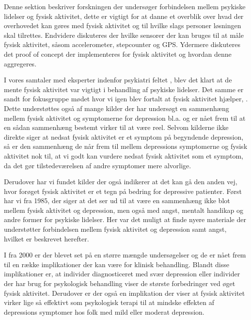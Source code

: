 Denne sektion beskriver forskningen der undersøger forbindelsen mellem psykiske lidelser og fysisk aktivitet, dette er vigtigt for at danne et overblik over hvad der overhovedet kan gøres med fysisk aktivitet og til hvilke slags personer løsningen skal tilrettes.
Endvidere diskuteres der hvilke sensorer der kan bruges til at måle fysisk aktivitet, såsom accelerometer, stepcounter og GPS.
Ydermere diskuteres det proof of concept der implementeres for fysisk aktivitet og hvordan denne aggregeres. 

I vores samtaler med eksperter indenfor psykiatri feltet \citep[Kapitel 1, Sektion 3 og 4]{misc:faellesrapp}, blev det klart at de mente fysisk aktivitet var vigtigt i behandling af psykiske lidelser.
Det samme er sandt for fokusgruppe mødet hvor vi igen blev fortalt at fysisk aktivitet hjælper, \citep[Kapitel 1, Sektion 5]{misc:faellesrapp}.
Dette understøttes også af mange kilder der har undersøgt en sammenhæng mellem fysisk aktivitet og symptomerne for depression bl.a. \citet{art:physDepSymptoms, Strawbridge15082002, Arredondo01072012} og er nået frem til at en sådan sammenhæng bestemt virker til at være reel.
Selvom kilderne ikke direkte siger at nedsat fysisk aktivitet er et symptom på begyndende depression, så er den sammenhæng de når frem til mellem depressions symptomerne og fysisk aktivitet nok til, at vi godt kan vurdere nedsat fysisk aktivitet som et symptom, da det gør tilstedeværelsen af andre symptomer mere alvorlige.

Derudover har vi fundet kilder der også indikerer at det kan gå den anden vej, hvor forøget fysisk aktivitet er et tegn på bedring for depressive patienter.
Først har vi \citet{misc:healthReports} fra 1985, der siger at det ser ud til at være en sammenhæng ikke blot mellem fysisk aktivitet og depression, men også med angst, mentalt handikap og andre former for psykiske lidelser.
Her var det muligt at finde nyere materiale der understøtter forbindelsen mellem fysisk aktivitet og depression samt angst, hvilket er beskrevet herefter.

I \citet{art:physMental} fra 2000 er der blevet set på en større mængde undersøgelser og de er nået frem til en række implikationer der kan være for klinisk behandling.
Blandt disse implikationer er, at individer diagnosticeret med svær depression eller individer der har brug for psykologisk behandling viser de største forbedringer ved øget fysisk aktivitet.
Derudover er der også en implikation der viser at fysisk aktivitet virker lige så effektivt som psykologisk terapi til at mindske effekten af depressions symptomer hos folk med mild eller moderat depression.


